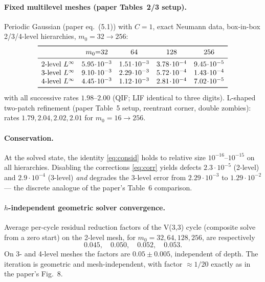 \documentclass[11pt]{article}
\theoremstyle{remark}
\begin{document}
\paragraph{Fixed multilevel meshes (paper Tables~2/3 setup).}  Periodic
Gaussian (paper eq.~(5.1)) with $C=1$, exact Neumann data, box-in-box
2/3/4-level hierarchies, $m_0=32\to256$:
\[
\begin{array}{lcccc}
\toprule
 & m_0{=}32 & 64 & 128 & 256\\
\midrule
\text{2-level } L^\infty & 5.95\!\cdot\!10^{-3} & 1.51\!\cdot\!10^{-3}
 & 3.78\!\cdot\!10^{-4} & 9.45\!\cdot\!10^{-5}\\
\text{3-level } L^\infty & 9.10\!\cdot\!10^{-3} & 2.29\!\cdot\!10^{-3}
 & 5.72\!\cdot\!10^{-4} & 1.43\!\cdot\!10^{-4}\\
\text{4-level } L^\infty & 4.45\!\cdot\!10^{-3} & 1.12\!\cdot\!10^{-3}
 & 2.81\!\cdot\!10^{-4} & 7.02\!\cdot\!10^{-5}\\
\bottomrule
\end{array}
\]
with all successive rates $1.98$--$2.00$ (QIF; LIF identical to three
digits).  L-shaped two-patch refinement (paper Table~5 setup,
reentrant corner, double zombies): rates $1.79,2.04,2.02,2.01$ for
$m_0=16\to256$.

\paragraph{Conservation.}  At the solved state, the identity
\eqref{eq:consid} holds to relative size
$10^{-16}$--$10^{-15}$ on all hierarchies.  Disabling the corrections
\eqref{eq:corr} yields defects $2.3\!\cdot\!10^{-5}$ (2-level) and
$2.9\!\cdot\!10^{-4}$ (3-level) \emph{and} degrades the 3-level error
from $2.29\!\cdot\!10^{-3}$ to $1.29\!\cdot\!10^{-2}$ --- the discrete
analogue of the paper's Table~6 comparison.

\paragraph{$h$-independent geometric solver convergence.}  Average
per-cycle residual reduction factors of the V(3,3) cycle (composite
solve from a zero start) on the 2-level mesh, for $m_0=32,64,128,256$,
are respectively
\[
  0.045,\quad 0.050,\quad 0.052,\quad 0.053.
\]
On 3- and 4-level meshes the factors are $0.05\pm0.005$, independent of
depth.  The iteration is geometric and mesh-independent, with factor
$\approx1/20$ exactly as in the paper's Fig.~8.
\end{document}
